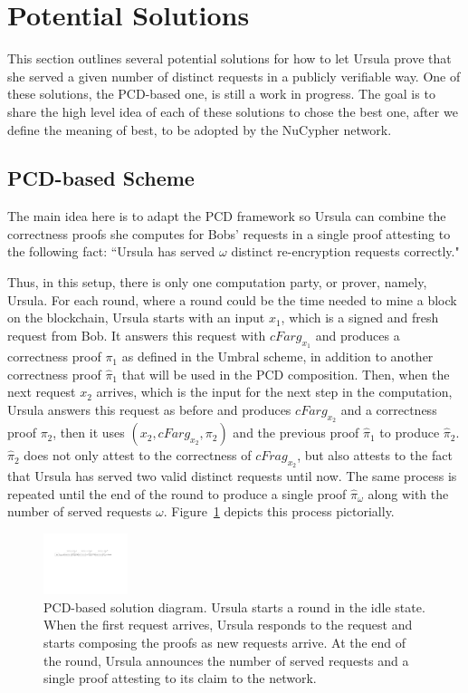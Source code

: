 \section{Potential Solutions}
\label{solutions}
This section outlines several potential solutions for how to let Ursula prove 
that she served a given number of distinct requests in a publicly verifiable way. 
One of these solutions, the PCD-based one, is still a work in progress. The goal 
is to share the high level idea of each of these solutions to chose the best one, 
after we define the meaning of best, to be adopted by the NuCypher network.


\subsection{PCD-based Scheme}
The main idea here is to adapt the PCD framework so Ursula 
can combine the correctness proofs she computes for Bobs' requests in a single proof 
attesting to the following fact: ``Ursula has served $\omega$ distinct re-encryption 
requests correctly." 


Thus, in this setup, there is only one computation party, or prover, namely, Ursula. 
For each round, where a round could be the time needed to mine a block on the 
blockchain, Ursula starts with an input $x_1$, which is a signed and fresh request 
from Bob. It answers this request with $cFarg_{x_1}$ and produces a correctness 
proof $\pi_1$ as defined in the Umbral scheme, in addition to another correctness 
proof $\hat{\pi}_1$ that will be used in the PCD composition. Then, when the next request $x_2$ arrives, 
which is the input for the next step in the computation, Ursula answers 
this request as before and produces $cFarg_{x_2}$ and a correctness proof $\pi_2$, then 
it uses $(x_2, cFarg_{x_2}, \pi_2)$ and the previous proof $\hat{\pi}_1$ to produce $\hat{\pi}_2$. 
$\hat{\pi}_2$ does not only 
attest to the correctness of $cFrag_{x_2}$, but also attests to the fact that Ursula has served 
two valid distinct requests until now. The same process is repeated until the end of the 
round to produce a single proof $\hat{\pi}_{\omega}$ along with the number of 
served requests $\omega$. Figure~\ref{pcd-based-sol} depicts 
this process pictorially.


\begin{figure}[h!]
\centerline{
\includegraphics[height= 0.7in, width = 1.0\columnwidth]{figures/pcd-based-sol.pdf}}
\caption{PCD-based solution diagram. Ursula starts a round in the idle state. When 
the first request arrives, Ursula responds to the request and starts composing the 
proofs as new requests arrive. At the end of the round, Ursula announces the number of 
served requests and a single proof attesting to its claim to the network. }
\label{pcd-based-sol}
\end{figure}


